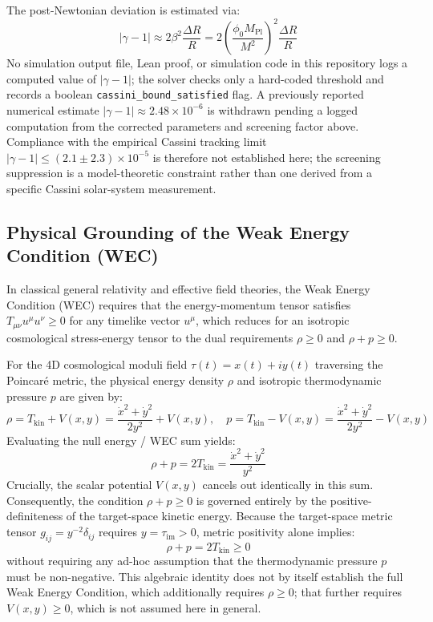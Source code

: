 \documentclass[11pt,a4paper]{article}
\begin{document}
The post-Newtonian deviation is estimated via:
\begin{equation}
|\gamma - 1| \approx 2 \beta^2 \frac{\Delta R}{R} = 2 \left(\frac{\phi_0 M_{\text{Pl}}}{M^2}\right)^2 \frac{\Delta R}{R}
\end{equation}
No simulation output file, Lean proof, or simulation code in this repository logs a computed value of $|\gamma - 1|$; the solver checks only a hard-coded threshold and records a boolean \texttt{cassini\_bound\_satisfied} flag. A previously reported numerical estimate $|\gamma - 1| \approx 2.48 \times 10^{-6}$ is withdrawn pending a logged computation from the corrected parameters and screening factor above. Compliance with the empirical Cassini tracking limit $|\gamma - 1| \le (2.1 \pm 2.3) \times 10^{-5}$ \cite{brax2021} is therefore not established here; the screening suppression is a model-theoretic constraint rather than one derived from a specific Cassini solar-system measurement.

\subsection{Physical Grounding of the Weak Energy Condition (WEC)}
In classical general relativity and effective field theories, the Weak Energy Condition (WEC) requires that the energy-momentum tensor satisfies $T_{\mu\nu} u^\mu u^\nu \ge 0$ for any timelike vector $u^\mu$, which reduces for an isotropic cosmological stress-energy tensor to the dual requirements $\rho \ge 0$ and $\rho + p \ge 0$.

For the 4D cosmological moduli field $\tau(t) = x(t) + i y(t)$ traversing the Poincar\'e metric, the physical energy density $\rho$ and isotropic thermodynamic pressure $p$ are given by:
\begin{equation}
\rho = T_{\text{kin}} + V(x, y) = \frac{\dot{x}^2 + \dot{y}^2}{2 y^2} + V(x, y), \quad
p = T_{\text{kin}} - V(x, y) = \frac{\dot{x}^2 + \dot{y}^2}{2 y^2} - V(x, y)
\end{equation}
Evaluating the null energy / WEC sum yields:
\begin{equation}
\rho + p = 2 T_{\text{kin}} = \frac{\dot{x}^2 + \dot{y}^2}{y^2}
\end{equation}
Crucially, the scalar potential $V(x, y)$ cancels out identically in this sum. Consequently, the condition $\rho + p \ge 0$ is governed entirely by the positive-definiteness of the target-space kinetic energy. Because the target-space metric tensor $g_{ij} = y^{-2}\delta_{ij}$ requires $y = \tau_{\text{im}} > 0$, metric positivity alone implies:
\begin{equation}
\rho + p = 2 T_{\text{kin}} \ge 0
\end{equation}
without requiring any ad-hoc assumption that the thermodynamic pressure $p$ must be non-negative. This algebraic identity does not by itself establish the full Weak Energy Condition, which additionally requires $\rho \ge 0$; that further requires $V(x,y) \ge 0$, which is not assumed here in general.
\end{document}
